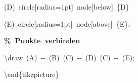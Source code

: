 {{\rule[-0.5ex]{0pt}{2.5ex}\hspace*{4.0em}(D)~circle[radius=1pt]~node[below]~\{D\}\\
\rule[-0.5ex]{0pt}{2.5ex}\hspace*{4.0em}(E)~circle[radius=1pt]~node[above]~\{E\};\\
\rule[-0.5ex]{0pt}{2.5ex}\hspace*{1.0em}\textcolor{G}{\textbf{\%~Punkte~verbinden}}\\
\rule[-0.5ex]{0pt}{2.5ex}\hspace*{1.0em}\textbackslash{}draw~(A)~{-}{-}~(B)~(C)~{-}{-}~(D)~(C)~{-}{-}~(E);\\
\rule[-0.5ex]{0pt}{2.5ex}\hspace*{0.0em}\textbackslash{}end\{tikzpicture\}}%
}%
\endgroup
